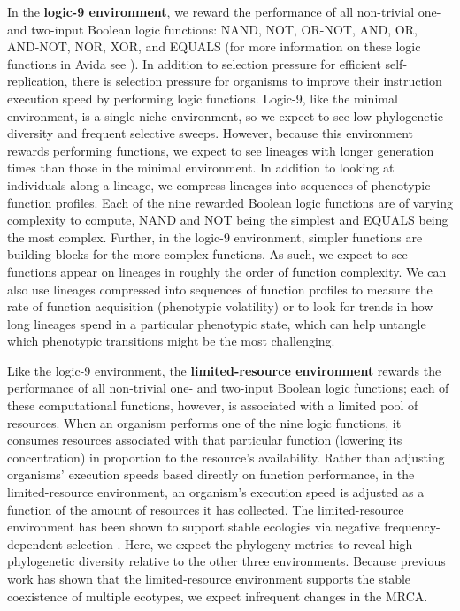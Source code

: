 \documentclass[letterpaper]{article}
\begin{document}
In the \textbf{logic-9 environment}, we reward the performance of all non-trivial one- and two-input Boolean logic functions: NAND, NOT, OR-NOT, AND, OR, AND-NOT, NOR, XOR, and EQUALS (for more information on these logic functions in Avida see \citealp{lenski_evolutionary_2003}). In addition to selection pressure for efficient self-replication, there is selection pressure for organisms to improve their instruction execution speed by performing logic functions. 
Logic-9, like the minimal environment, is a single-niche environment, so we expect to see low phylogenetic diversity and frequent selective sweeps. However, because this environment rewards performing functions, we expect to see lineages with longer generation times than those in the minimal environment. 
In addition to looking at individuals along a lineage, we compress lineages into sequences of phenotypic function profiles. Each of the nine rewarded Boolean logic functions are of varying complexity to compute, NAND and NOT being the simplest and EQUALS being the most complex. Further, in the logic-9 environment, simpler functions are building blocks for the more complex functions. 
As such, we expect to see functions appear on lineages in roughly the order of function complexity.
We can also use lineages compressed into sequences of function profiles to measure the rate of function acquisition (phenotypic volatility) or to look for trends in how long lineages spend in a particular phenotypic state, which can help untangle which phenotypic transitions might be the most challenging.

Like the logic-9 environment, the \textbf{limited-resource environment} rewards the performance of all non-trivial one- and two-input Boolean logic functions; each of these computational functions, however, is associated with a limited pool of resources. When an organism performs one of the nine logic functions, it consumes resources associated with that particular function (lowering its concentration) in proportion to the resource's availability. 
Rather than adjusting organisms' execution speeds based directly on function performance, in the limited-resource environment, an organism's execution speed is adjusted as a function of the amount of resources it has collected.
The limited-resource environment has been shown to support stable ecologies via negative frequency-dependent selection \citep{cooper_evolution_2003}. 
Here, we expect the phylogeny metrics to reveal high phylogenetic diversity relative to the other three environments. 
Because previous work has shown that the limited-resource environment supports the stable coexistence of multiple ecotypes, we expect infrequent changes in the MRCA.
\end{document}
